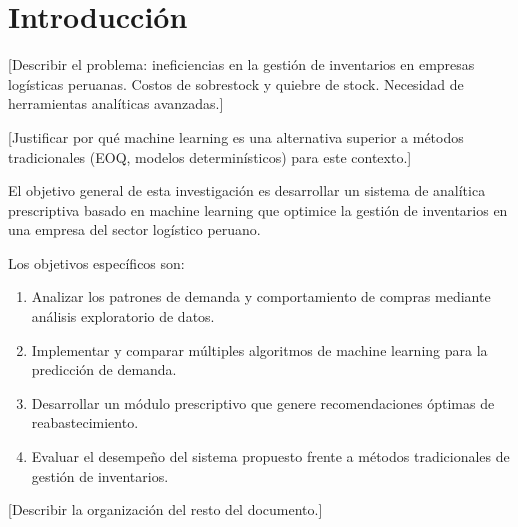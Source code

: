 \section{Introducci\'{o}n}
\label{sec:introduction}

[Describir el problema: ineficiencias en la gesti\'{o}n de inventarios en empresas log\'{i}sticas peruanas. Costos de sobrestock y quiebre de stock. Necesidad de herramientas anal\'{i}ticas avanzadas.]

[Justificar por qu\'{e} machine learning es una alternativa superior a m\'{e}todos tradicionales (EOQ, modelos determin\'{i}sticos) para este contexto.]

El objetivo general de esta investigaci\'{o}n es desarrollar un sistema de anal\'{i}tica prescriptiva basado en machine learning que optimice la gesti\'{o}n de inventarios en una empresa del sector log\'{i}stico peruano.

Los objetivos espec\'{i}ficos son:
\begin{enumerate}
    \item Analizar los patrones de demanda y comportamiento de compras mediante an\'{a}lisis exploratorio de datos.
    \item Implementar y comparar m\'{u}ltiples algoritmos de machine learning para la predicci\'{o}n de demanda.
    \item Desarrollar un m\'{o}dulo prescriptivo que genere recomendaciones \'{o}ptimas de reabastecimiento.
    \item Evaluar el desempe\~{n}o del sistema propuesto frente a m\'{e}todos tradicionales de gesti\'{o}n de inventarios.
\end{enumerate}

[Describir la organizaci\'{o}n del resto del documento.]
